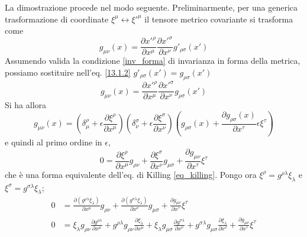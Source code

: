 La dimostrazione procede nel modo seguente.  Preliminarmente, per una generica
trasformazione di coordinate $\xi^{\mu} \leftrightarrow \xi'^{\mu}$ il tensore
metrico covariante si trasforma come
\begin{equation}
  g_{\mu \nu} (x) =
  \frac{\partial x'^{\rho}  }{\partial x^{\mu}}
  \frac{\partial x'^{\sigma}}{\partial x^{\nu}}  g'_{\rho \sigma} (x')
  \label{13.1.2}
\end{equation}
Assumendo valida la condizione \eqref{inv_forma} di invarianza in forma della
metrica, possiamo sostituire nell'eq. \eqref{13.1.2} $g'_{\rho \sigma} (x')=
g_{\rho \sigma} (x')$
\begin{equation}
  g_{\mu \nu} (x) =
  \frac{\partial x'^{\rho}  }{\partial x^{\mu}}
  \frac{\partial x'^{\sigma}}{\partial x^{\nu}}  g_{\rho \sigma} (x')
\end{equation}
Si ha allora
\begin{equation}
  g_{\mu \nu} (x) =
  \left( \delta ^{\rho}_{\mu}   + \epsilon \frac{\partial \xi^{\rho}}{\partial
      x^{\mu}} \right)
  \left( \delta ^{\sigma}_{\nu} + \epsilon \frac{\partial \xi^{\sigma}}{\partial
      x^{\nu}}  \right)
  \left( g_{\rho \sigma} (x) + \frac{\partial g_{\rho \sigma}(x)}{\partial
      x^{\tau}} \epsilon \xi^{\tau} \right)
\end{equation}
e quindi al primo ordine in $\epsilon$,
\begin{equation}
  0 =  \frac{\partial \xi^{\rho}}{\partial x^{\mu}}  g_{\rho \nu} +
  \frac{\partial \xi^{\sigma}}{\partial x^{\nu}} g_{\mu \sigma} +
  \frac{\partial g_{\mu \nu}}{\partial x^{\tau}} \xi^{\tau}
  \label{eq_killing_2}
\end{equation}
che è una forma equivalente dell'eq. di Killing \eqref{eq_killing}.
Pongo ora $\xi^{\rho}   =  g^{\rho   \lambda} \xi_{\lambda}$ e
$\xi^{\sigma} =  g^{\sigma \lambda} \xi_{\lambda}$;
\begin{subequations}
  \begin{align}
    0 &= \frac{\partial ( g^{\rho   \lambda} \xi_{\lambda})  } {\partial
        x^{\mu}}  g_{\rho \nu}  +
        \frac{\partial ( g^{\sigma \lambda} \xi_{\lambda})  } {\partial x^{\nu}}
        g_{\mu \sigma} +
        \frac{\partial g_{\mu \nu}}{\partial x^{\tau}} \xi^{\tau} \\
    0 &=  \xi_{\lambda}     g_{\rho \nu}   \frac{\partial g^{\rho   \lambda}}
        {\partial x^{\mu}}  +
        g^{\rho \lambda}  g_{\rho \nu  } \frac{\partial \xi_{\lambda}     }
        {\partial x^{\mu}}  +
        \xi_{\lambda}     g_{\mu \sigma} \frac{\partial g^{\sigma \lambda} }
        {\partial x^{\nu}}  +
        g^{\sigma \lambda}g_{\mu \sigma} \frac{\partial \xi_{\lambda}      }
        {\partial x^{\nu}}   +
        \frac{\partial    g_{\mu \nu}}        {\partial x^{\tau}} \xi^{\tau}
  \end{align}
\end{subequations}
